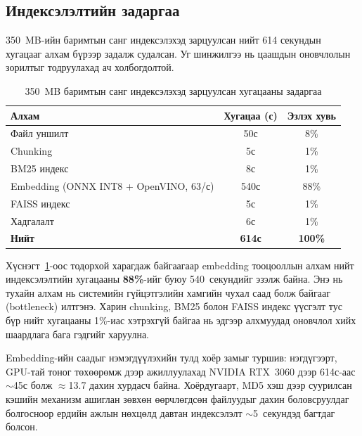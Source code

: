 \documentclass[11pt,a4paper]{article}
\begin{document}
\subsection{Индексэлэлтийн задаргаа}

350~MB-ийн баримтын санг индексэлэхэд зарцуулсан нийт 614 секундын хугацааг алхам бүрээр задалж судалсан. Уг шинжилгээ нь цаашдын оновчлолын зорилтыг тодруулахад ач холбогдолтой.

\begin{table}[H]
\centering
\caption{350~MB баримтын санг индексэлэхэд зарцуулсан хугацааны задаргаа}
\label{tab:breakdown}
\begin{tabular}{|l|c|c|}
\hline
\textbf{Алхам} & \textbf{Хугацаа (с)} & \textbf{Эзлэх хувь} \\
\hline
Файл уншилт                           & 50с  & 8\%  \\
\hline
Chunking                               & 5с   & 1\%  \\
\hline
BM25 индекс                            & 8с   & 1\%  \\
\hline
Embedding (ONNX INT8 + OpenVINO, 63/с) & 540с & 88\% \\
\hline
FAISS индекс                           & 5с   & 1\%  \\
\hline
Хадгалалт                              & 6с   & 1\%  \\
\hline
\textbf{Нийт}                          & \textbf{614с} & \textbf{100\%} \\
\hline
\end{tabular}
\end{table}

Хүснэгт~\ref{tab:breakdown}-оос тодорхой харагдаж байгаагаар embedding тооцооллын алхам нийт индексэлэлтийн хугацааны \textbf{88\%}-ийг буюу 540~секундийг эзэлж байна. Энэ нь тухайн алхам нь системийн гүйцэтгэлийн хамгийн чухал саад болж байгааг (bottleneck) илтгэнэ. Харин chunking, BM25 болон FAISS индекс үүсгэлт тус бүр нийт хугацааны 1\%-иас хэтрэхгүй байгаа нь эдгээр алхмуудад оновчлол хийх шаардлага бага гэдгийг харуулна.

Embedding-ийн саадыг нэмэгдүүлэхийн тулд хоёр замыг туршив: нэгдүгээрт, GPU-тай тоног төхөөрөмж дээр ажиллуулахад NVIDIA RTX~3060 дээр 614с-аас $\sim$45с болж $\approx$13.7 дахин хурдасч байна. Хоёрдугаарт, MD5 хэш дээр суурилсан кэшийн механизм ашиглан зөвхөн өөрчлөгдсөн файлуудыг дахин боловсруулдаг болгосноор ердийн ажлын нөхцөлд давтан индексэлэлт $\sim$5~секундэд багтдаг болсон.
\end{document}
